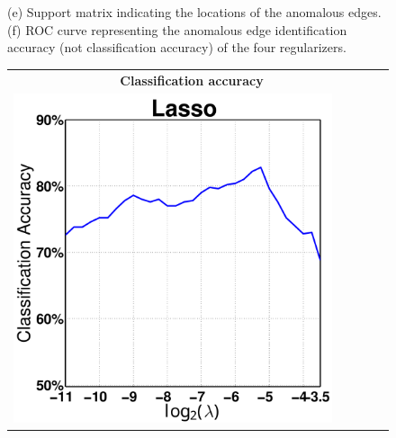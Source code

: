 \begin{figure}[ptbh]
{		(e) Support matrix indicating the locations of the anomalous edges.
		(f) ROC curve representing the anomalous edge identification accuracy (not classification accuracy) of the four regularizers.
	}
	\label{fig:sim,weight,result}
	\vspace{10pt}
	\renewcommand{\imwidth}  {0.2449\linewidth}
	\renewcommand{\imheight}  {0.2449\linewidth}
	\setlength{\tabcolsep}{1pt} 
	\begin{tabular}{ccccc}
	\multicolumn{4}{c}{{\textbf{\normalsize{Classification accuracy}}}} \vspace{0pt} \\
	\includegraphics[height=\imheight,width=\imwidth]{sim_gridsearch_lass_acc100.pdf} &

\end{tabular}
\end{figure}
